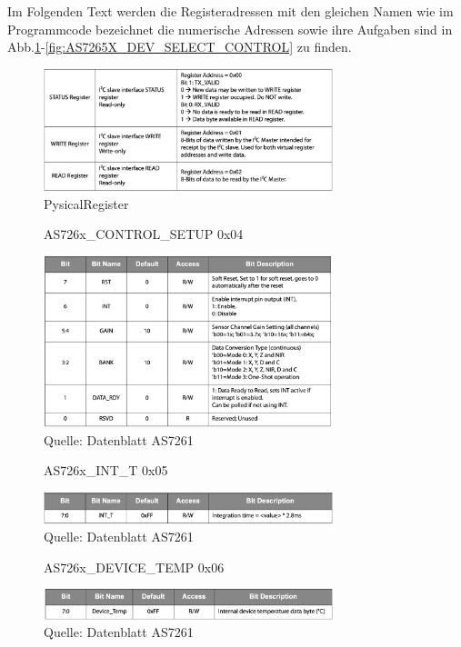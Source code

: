 \noindent Im Folgenden Text werden die Registeradressen mit den gleichen Namen wie im Programmcode bezeichnet die numerische Adressen sowie ihre Aufgaben sind in Abb.\ref{fig:PysicalRegister}-\ref{fig:AS7265X_DEV_SELECT_CONTROL} zu finden.

\begin{figure}[H]
\centering
\includegraphics[width=0.75\textwidth]{img/PysicalRegister}
\caption{PysicalRegister}
\label{fig:PysicalRegister}
\end{figure}

\begin{figure}[H]
\centering
\caption{AS726x\_CONTROL\_SETUP 0x04}
\includegraphics[width=0.75\textwidth]{img/AS726x_CONTROL_SETUP}
\caption*{Quelle: Datenblatt AS7261}
\label{fig:AS726x_CONTROL_SETUP}
\end{figure}

\begin{figure}[H]
\centering
\caption{AS726x\_INT\_T 0x05}
\includegraphics[width=0.75\textwidth]{img/AS726x_INT_T}
\caption*{Quelle: Datenblatt AS7261}
\label{fig:AS726x_INT_T}
\end{figure}

\begin{figure}[H]
\centering
\caption{AS726x\_DEVICE\_TEMP 0x06}
\includegraphics[width=0.75\textwidth]{img/AS726x_DEVICE_TEMP}
\caption*{Quelle: Datenblatt AS7261}
\label{fig:AS726x_DEVICE_TEMP}
\end{figure}


